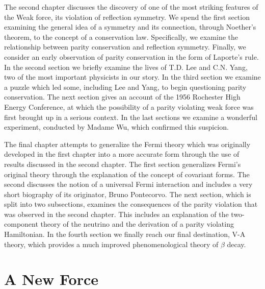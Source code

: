 \documentclass[12pt]{book}
\begin{document}
The second chapter discusses the discovery of one of the most striking features of the Weak force, its violation of reflection symmetry. We spend the first section examining the general idea of a symmetry and its connection, through Noether's theorem, to the concept of a conservation law. Specifically, we examine the relationship between parity conservation and reflection symmetry. Finally, we consider an early observation of parity conservation in the form of Laporte's rule. In the second section we briefly examine the lives of T.D. Lee and C.N. Yang, two of the most important physicists in our story. In the third section we examine a puzzle which led some, including Lee and Yang, to begin questioning parity conservation. The next section gives an account of the 1956 Rochester High Energy Conference, at which the possibility of a parity violating weak force was first brought up in a serious context. In the last sections we examine a wonderful experiment, conducted by Madame Wu, which confirmed this suspicion.

The final chapter attempts to generalize the Fermi theory which was originally developed in the first chapter into a more accurate form through the use of results discussed in the second chapter. The first section generalizes Fermi's original theory through the explanation of the concept of covariant forms. The second discusses the notion of a universal Fermi interaction and includes a very short biography of its originator, Bruno Pontecorvo. The next section, which is split into two subsections, examines the consequences of the parity violation that was observed in the second chapter. This includes an explanation of the two-component theory of the neutrino and the derivation of a parity violating Hamiltonian. In the fourth section we finally reach our final destination, V-A theory, which provides a much improved phenomenological theory of $\beta$ decay. 




\chapter{A New Force}
\end{document}
